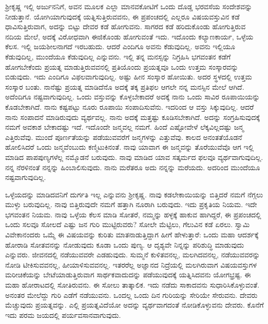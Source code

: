 ಶ‍್ರೀಕೃಷ್ಣ ಇಲ್ಲಿ ಅರ್ಜುನನಿಗೆ, ಅವನ ಮೂಲಕ ಎಲ್ಲಾ ಮಾನವಕೋಟಿಗೆ ಒಂದು ದೊಡ್ಡ ಭರವಸೆಯ ಸಂದೇಶವನ್ನು ನೀಡುತ್ತಾನೆ. ಯೋಗಿಯಾಗುವುದಕ್ಕೆ ಯತ್ನಿಸುತ್ತಿರುವವನು, ಈ ಪ್ರಪಂಚದಲ್ಲಿ ಎಲ್ಲರೂ ವಿಷಯವಸ್ತುವಿನ ಕಡೆ ಧಾವಿಸುತ್ತಿರುವಾಗ, ಅದನ್ನು ಬಿಟ್ಟು ದೇವರ ಕಡೆ ಹೋಗುವನು. ಸಾಗರದ ಕಡೆ ಹರಿದುಕೊಂಡು ಹೋಗುತ್ತಿರುವ ನದಿಯ ಮೇಲೆ, ಅದಕ್ಕೆ ವಿರೋಧವಾಗಿ ಈಜಿಕೊಂಡು ಹೋಗುವಂತೆ ಇದು. ಇದೊಂದು ಕಲ್ಯಾಣಕಾರ್ಯ, ಒಳ್ಳೆಯ ಕೆಲಸ. ಇಲ್ಲಿ ಜಯಶೀಲನಾಗದೆ ಇರಬಹುದು. ಆದರೆ ಎಂದಿಗೂ ಅವನು ಕೆಡುವುದಿಲ್ಲ. ಅವನು ಇಲ್ಲಿಯೂ ಕೆಡುವುದಿಲ್ಲ, ಮುಂದೆಯೂ ಕೆಡುವುದಿಲ್ಲ ಎನ್ನುವನು. ಇಲ್ಲಿ ತನ್ನ ಮನಸ್ಸನ್ನು ನಿಗ್ರಹಿಸಿ ಭಗವಂತನ ಕಡೆಗೆ ಹೋಗಬೇಕೆಂದು ಪ್ರಯತ್ನ ಮಾಡುತ್ತಿರುವವನಲ್ಲಿ ಪ್ರತಿಯೊಂದು ಪ್ರಯತ್ನವೂ ಒಂದು ಉತ್ತಮ ಸಂಸ್ಕಾರವನ್ನು ಬಿಡುವುದು. ಇದು ಎಂದಿಗೂ ವಿಫಲವಾಗುವುದಿಲ್ಲ. ಅಷ್ಟು ಹೀನ ಸಂಸ್ಕಾರ ಹೋಯಿತು. ಅದರ ಸ್ಥಳದಲ್ಲಿ ಉತ್ತಮ ಸಂಸ್ಕಾರ ಬಂತು. ನಾನೆಷ್ಟು ಪ್ರಯತ್ನ ಮಾಡಿದೆನೊ ಅದಕ್ಕೆ ತಕ್ಕ ಪ್ರತಿಫಲ ಆಗಲೇ ನನ್ನ ಮನಸ್ಸಿನ ಮೇಲೆ ಆಗಿದೆ. ಅದೆಂದಿಗೂ ನಷ್ಟವಾಗುವುದಿಲ್ಲ. ಒಂದು ವಸ್ತುವನ್ನು ಕೊಳ್ಳಬೇಕಾದರೆ ಅದಕ್ಕೆ ನಾನು ಒಂದು ಸಾವಿರ ರೂಪಾಯಿಯನ್ನು ಕೊಡಬೇಕಾಗಿದೆ. ನಾನು ಕಷ್ಟಪಟ್ಟು ನೂರು ರೂಪಾಯಿ ಸಂಪಾದಿಸುವೆನು. ಇದರಿಂದ ಆ ವಸ್ತು ಸಿಕ್ಕುವುದಿಲ್ಲ. ಆದರೆ ನಾನು ಸಂಪಾದನೆ ಮಾಡಿರುವುದು ವ್ಯರ್ಥವಲ್ಲ. ನಾನು ಅದಕ್ಕೆ ಮತ್ತಷ್ಟು ಕೂಡಿಸಬೇಕಾಗಿದೆ. ಅದನ್ನು ಸಂಗ್ರಹಿಸುವುದಕ್ಕೆ ನಮಗೆ ಅವಕಾಶ ಬೇಕಾದಷ್ಟು ಇದೆ. ಇದೊಂದೇ ಜನ್ಮವಲ್ಲ ನಮಗೆ. ಹಿಂದೆ ಎಷ್ಟೋವೇಳೆ ಲೆಕ್ಕವಿಲ್ಲದಷ್ಟು ಜನ್ಮ ಎತ್ತಿರುವೆವು. ಮುಂದೆ ಪೂರ್ಣತೆಯನ್ನು ಪಡೆಯುವವರೆಗೆ ಜನ್ಮಗಳನ್ನು ಎತ್ತುವೆವು. ಕಾಲದ ಅನಂತತೆಯೊಡನೆ ಹೋಲಿಸಿದರೆ ಒಂದು ಜನ್ಮವೆಂಬುದು ಕಣ್ಮಿಟುಕಿನಂತೆ. ನಾವು ಯಾವಾಗ ಈ ಜನ್ಮವನ್ನು ತೊರೆಯುವೆವೊ ಆಗ ಇಲ್ಲಿ ಮಾಡಿದ ಪಾಪಪುಣ್ಯಗಳೆಲ್ಲ ನಮ್ಮೊಡನೆ ಬರುವುದು. ನಾವು ಮಾಡಿದ ಯಾವ ಸತ್ಕರ್ಮದ ಫಲವೂ ವ್ಯರ್ಥವಾಗುವುದಿಲ್ಲ. ನನ್ನ ನೆರಳಿನಂತೆ ನನ್ನನ್ನು ಹಿಂಬಾಲಿಸುವುದು. ನಾನು ಮರೆತರೂ ಅದು ನನ್ನನ್ನು ಮರೆಯದು. ಅದರಿಂದ ಮುಂದೆಯೂ ನಷ್ಟವಾಗುವುದಿಲ್ಲ.

ಒಳ್ಳೆಯದನ್ನು ಮಾಡಿದವನಿಗೆ ದುರ್ಗತಿ ಇಲ್ಲ ಎನ್ನುವನು ಶ‍್ರೀಕೃಷ್ಣ. ನಾವು ಕಡಲೇಕಾಯಿಯನ್ನು ಬಿತ್ತಿದರೆ ನಮಗೆ ನೆಗ್ಗಲು ಮುಳ್ಳು ಬರುವುದಿಲ್ಲ. ನಾವು ಬಿತ್ತಿರುವುದೇ ನಮಗೆ ಹತ್ತಾಗಿ ನೂರಾಗಿ ಬರುವುದು. ಇದು ಪ್ರಕೃತಿಯ ನಿಯಮ. ಇದೇ ಭಗವಂತನ ನಿಯಮ. ನಾವು ಒಳ್ಳೆಯ ಕೆಲಸ ಮಾಡಿ ಸೋತರೆ, ನಮ್ಮನ್ನು ಹಳ್ಳಕ್ಕೆ ಹಾಕುವ ಹಾಗಿದ್ದರೆ, ಈ ಪ್ರಪಂಚದಲ್ಲಿ ಒಂದು ಸಲವೂ ಸೋಲದೆ ಎಷ್ಟು ಜನ ಗುರಿ ಮುಟ್ಟಿರುವರು? ಸೋಲೇ ಮೆಟ್ಟಿಲು, ಗೆಲುವಿನ ಕಡೆ ಏರಲು. ಸ್ವಾಮಿ ವಿವೇಕಾನಂದರು ಒಮ್ಮೆ ಈ ವಿಷಯವನ್ನು ಕುರಿತು ಮಾತನಾಡುತ್ತಿದ್ದಾಗ ಹೀಗೆ ಹೇಳುತ್ತಾರೆ: ಒಂದು ಮಹಾ ಆದರ್ಶಕ್ಕೆ ಹೋರಾಡಿ ಸೋತವನನ್ನು ನೋಡುವುದು ಕೂಡಾ ಒಂದು ಪುಣ್ಯ. ಆ ದೃಶ್ಯವೇ ನಿನ್ನನ್ನು ಪರಿಶುದ್ಧಿ ಮಾಡುವುದು ಎನ್ನುವರು. ಜೀವನದಲ್ಲಿ ನಡೆಯುವವರೇ ಎಡಹುವುದು. ಸುಮ್ಮನೆ ಕುಳಿತವನಲ್ಲ, ಮಲಗಿದವನಲ್ಲ, ನಡೆಯುವವರನ್ನು ನೋಡಿ ಟೀಕಿಸುವವನಲ್ಲ, ಹೀಯಾಳಿಸುವವನಲ್ಲ. ಇತರರೆಲ್ಲ ಅಜ್ಞಾನದ ನಿದ್ರೆಯಲ್ಲಿ ಮಲಗಿರುವಾಗ ವಿಷಯವಸ್ತುಗಳ ಮರೀಚಿಕೆಯನ್ನು ಬೇಟೆಯಾಡುತ್ತಿರುವಾಗ ಸಾರ್ಥಕವಾದುದನ್ನು ಪಡೆಯುವುದಕ್ಕೆ ಯತ್ನಿಸಿದವನು ಯೋಗಭ್ರಷ್ಟ. ಈ ಮಹಾ ಹೋರಾಟದಲ್ಲಿ ಸೋತಿರುವನು. ಈ ಸೋಲು ತಾತ್ಕಾಲಿಕ. ಇದು ನಡೆದು ಸಾಕಾದವನು ಸುಧಾರಿಸಿಕೊಳ್ಳುವಂತೆ. ಅನಂತರ ಮೇಲೆದ್ದು ಗುರಿ ಎಡೆಗೆ ನಡೆಯುವನು. ಒಂದಲ್ಲ ಒಂದು ದಿನ ಗುರಿಯನ್ನು ಸೇರಿಯೇ ಸೇರುವನು. ದೇವರು ಮೆಚ್ಚುವುದು ಪ್ರಯತ್ನವನ್ನು. ಎಲ್ಲಿ ಪ್ರಯತ್ನವಿದೆಯೋ ಅದನ್ನು ವ್ಯರ್ಥವಾಗದಂತೆ ನೋಡಿಕೊಳ್ಳುವನು ದೇವರು. ಕೊನೆಗೆ ಇದು ಪರಮ ಜಯದಲ್ಲಿ ಪರ್ಯವಸಾನವಾಗುವುದು.

